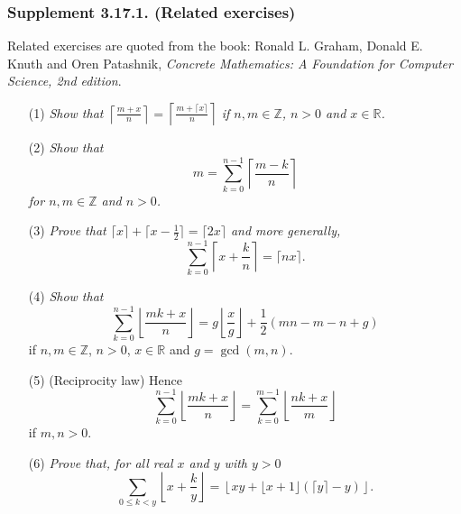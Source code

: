 \documentclass{article}
\begin{document}



\subsubsection*{Supplement 3.17.1. (Related exercises)}
Related exercises are quoted from the book:
Ronald L. Graham, Donald E. Knuth and Oren Patashnik,
\emph{Concrete Mathematics: A Foundation for Computer Science, 2nd edition}.

\begin{enumerate}
\item[(1)]
  \emph{Show that $\left\lceil \frac{m + x}{n} \right\rceil
  = \left\lceil \frac{m + \lceil x \rceil}{n} \right\rceil$
  if $n, m \in \mathbb{Z}$, $n > 0$ and $x \in \mathbb{R}$.}

\item[(2)]
  \emph{Show that
  \[
    m = \sum_{k=0}^{n-1} \left\lceil \frac{m - k}{n} \right\rceil
  \]
  for $n, m \in \mathbb{Z}$ and $n > 0$.}

\item[(3)]
  \emph{Prove that $\lceil x \rceil + \lceil x-\frac{1}{2} \rceil = \lceil 2x \rceil$
  and more generally,}
  \[
    \sum_{k=0}^{n-1} \left\lceil x + \frac{k}{n} \right\rceil
    = \lceil nx \rceil.
  \]

\item[(4)]
  \emph{Show that}
  \[
    \sum_{k=0}^{n-1} \left\lfloor \frac{mk + x}{n} \right\rfloor
    = g \left\lfloor \frac{x}{g} \right\rfloor + \frac{1}{2}(mn - m - n + g)
  \]
  if $n, m \in \mathbb{Z}$, $n > 0$, $x \in \mathbb{R}$ and $g = \gcd(m,n)$.

\item[(5)]
  (Reciprocity law) Hence
  \[
    \sum_{k=0}^{n-1} \left\lfloor \frac{mk + x}{n} \right\rfloor
    = \sum_{k=0}^{m-1} \left\lfloor \frac{nk + x}{m} \right\rfloor
  \]
  if $m, n > 0$.

\item[(6)]
  \emph{Prove that, for all real $x$ and $y$ with $y > 0$}
  \[
    \sum_{0 \leq k < y} \left\lfloor x + \frac{k}{y} \right\rfloor
    = \left\lfloor xy + \lfloor x+1 \rfloor(\lceil y \rceil - y) \right\rfloor.
  \] \\
\end{enumerate}



\end{document}

